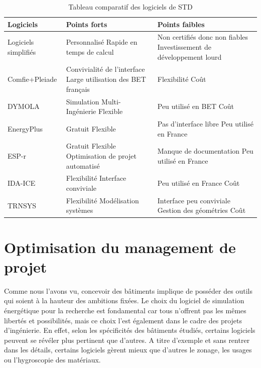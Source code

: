 \begin{table}[h]
\centering
\begin{tabular}{|p{3.4cm}||p{5.75cm}|p{5.75cm}|}
\hline Logiciels & Points forts & Points faibles \\
\hline
\hline Logiciels simplifiés & Personnalisé \newline Rapide en temps de calcul & Non certifiés donc non fiables \newline Investissement de développement lourd \\
\hline Comfie+Pleiade & Convivialité de l'interface \newline Large utilisation des BET français & Flexibilité \newline Coût \\
\hline DYMOLA & Simulation Multi-Ingénierie \newline Flexible & Peu utilisé en BET \newline Coût \\
\hline EnergyPlus & Gratuit \newline Flexible & Pas d'interface libre \newline Peu utilisé en France \\
\hline ESP-r & Gratuit \newline Flexible \newline Optimisation de projet automatisé & Manque de documentation \newline Peu utilisé en France \\
\hline IDA-ICE & Flexibilité \newline Interface conviviale & Peu utilisé en France \newline Coût \\
\hline TRNSYS & Flexibilité \newline Modélisation systèmes  & Interface peu conviviale \newline Gestion des géométries \newline Coût \\
\hline 
\end{tabular}
\caption{Tableau comparatif des logiciels de STD}
\label{Tab:Synthese_logiciels_STD}
\end{table}

\section{Optimisation du management de projet}

Comme nous l'avons vu, concevoir des bâtiments implique de posséder des outils qui soient à la hauteur des ambitions fixées. Le choix du logiciel de simulation énergétique pour la recherche est fondamental car tous n'offrent pas les mêmes libertés et possibilités, mais ce choix l'est également dans le cadre des projets d'ingénierie. En effet, selon les spécificités des bâtiments étudiés, certains logiciels peuvent se révéler plus pertinent que d'autres. A titre d'exemple et  sans rentrer dans les détails, certains logiciels gèrent mieux que d'autres le zonage, les usages ou l'hygroscopie des matériaux.

